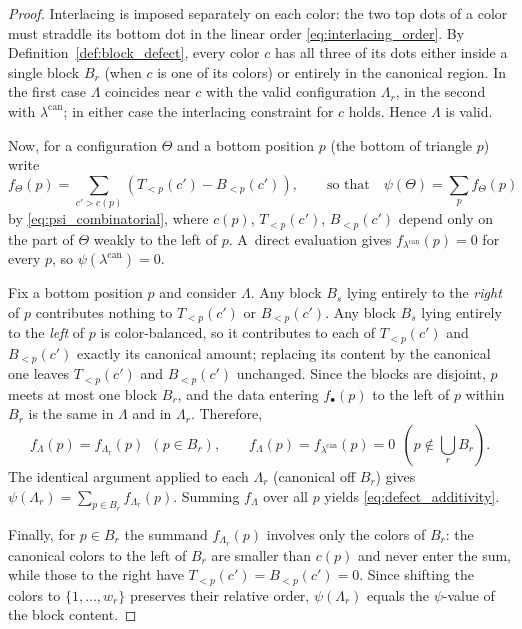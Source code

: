 \documentclass[10pt,a4paper]{amsart}
\numberwithin{equation}{section}
\theoremstyle{definition}
\begin{document}
\begin{proof}
	Interlacing is imposed separately on each color: the two
	top dots of a color must straddle its bottom dot in the linear order
	\eqref{eq:interlacing_order}. By Definition~\ref{def:block_defect}, every color $c$ has
	all three of its dots either inside a single block $B_r$ (when $c$ is one of
	its colors) or entirely in the canonical region. In the first case $\Lambda$
	coincides near $c$ with the valid configuration $\Lambda_r$, in the second
	with $\lambda^{\mathrm{can}}$; in either case the interlacing constraint for
	$c$ holds. Hence $\Lambda$ is valid.

	Now, for a configuration $\Theta$ and a bottom position $p$
	(the bottom of triangle $p$) write
\[
f_\Theta(p)=\sum_{c'>c(p)} (T_{<p}(c')-B_{<p}(c') ),
		\qquad\text{so that}\quad \psi(\Theta)=\sum_{p}f_\Theta(p)
\]
	by \eqref{eq:psi_combinatorial}, where $c(p)$, $T_{<p}(c')$, $B_{<p}(c')$
	depend only on the part of $\Theta$ weakly to the left of $p$. A~direct
	evaluation gives $f_{\lambda^{\mathrm{can}}}(p)=0$ for every $p$, so
	$\psi(\lambda^{\mathrm{can}})=0$.

	Fix a bottom position $p$ and consider $\Lambda$. Any block $B_s$ lying
	entirely to the \emph{right} of $p$ contributes nothing to $T_{<p}(c')$ or
	$B_{<p}(c')$. Any block $B_s$ lying entirely to the \emph{left} of $p$ is
	color-balanced, so it contributes to each of $T_{<p}(c')$ and $B_{<p}(c')$
	exactly its canonical amount; replacing its content by the canonical one
	leaves $T_{<p}(c')$ and $B_{<p}(c')$ unchanged. Since the blocks are disjoint,
	$p$ meets at most one block $B_r$, and the data entering $f_\bullet(p)$ to the
	left of $p$ within $B_r$ is the same in $\Lambda$ and in $\Lambda_r$.
	Therefore,
	\[
		f_{\Lambda}(p)=f_{\Lambda_r}(p)\ \ (p\in B_r),
		\qquad
		f_{\Lambda}(p)=f_{\lambda^{\mathrm{can}}}(p)=0\ \ (p\notin\textstyle\bigcup_r B_r).
	\]
	The identical argument applied to each $\Lambda_r$ (canonical off $B_r$)
	gives $\psi(\Lambda_r)=\sum_{p\in B_r}f_{\Lambda_r}(p)$. Summing
	$f_{\Lambda}$ over all $p$ yields \eqref{eq:defect_additivity}.

	Finally, for $p\in B_r$ the summand $f_{\Lambda_r}(p)$ involves only
	the colors of $B_r$: the canonical colors to the left of $B_r$ are
	smaller than $c(p)$ and never enter the sum, while those to the right
	have $T_{<p}(c')=B_{<p}(c')=0$. Since shifting the colors to
	$\{1,\dots,w_r\}$ preserves their relative order, $\psi(\Lambda_r)$
	equals the $\psi$-value of the block content.
\end{proof}
\end{document}
